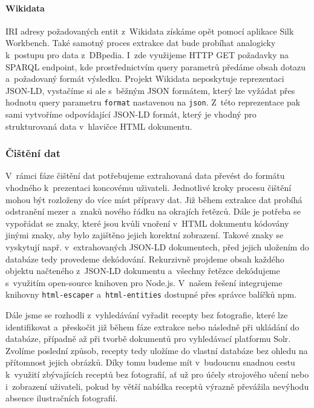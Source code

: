 \paragraph{Wikidata}

IRI adresy požadovaných entit z~Wikidata získáme opět pomocí aplikace Silk Workbench. Také samotný proces extrakce dat bude probíhat analogicky k~postupu pro data z~DBpedia. I~zde využijeme HTTP GET požadavky na SPARQL endpoint, kde prostřednictvím query parametrů předáme obsah dotazu a~požadovaný formát výsledku. Projekt Wikidata neposkytuje reprezentaci JSON-LD, vystačíme si ale s~běžným JSON formátem, který lze vyžádat přes hodnotu query parametru \texttt{format} nastavenou na \texttt{json}. Z~této reprezentace pak sami vytvoříme odpovídající JSON-LD formát, který je vhodný pro strukturovaná data v~hlavičce HTML dokumentu.

\subsubsection{Čištění dat}

V~rámci fáze čištění dat potřebujeme extrahovaná data převést do formátu vhodného k~prezentaci koncovému uživateli. Jednotlivé kroky procesu čištění mohou být rozloženy do více míst přípravy dat. Již během extrakce dat probíhá odstranění mezer a~znaků nového řádku na okrajích řetězců. Dále je potřeba se vypořádat se znaky, které jsou kvůli vnoření v~HTML dokumentu kódovány jinými znaky, aby bylo zajištěno jejich korektní zobrazení. Takové znaky se vyskytují např. v~extrahovaných JSON-LD dokumentech, před jejich uložením do databáze tedy provedeme dekódování. Rekurzivně projdeme obsah každého objektu načteného z~JSON-LD dokumentu a~všechny řetězce dekódujeme s~využitím open-source knihoven pro Node.js. V~našem řešení integrujeme knihovny \texttt{html-escaper} a~\texttt{html-entities} dostupné přes správce balíčků npm.

Dále jsme se rozhodli z~vyhledávání vyřadit recepty bez fotografie, které lze identifikovat a~přeskočit již během fáze extrakce nebo následně při ukládání do databáze, případně až při tvorbě dokumentů pro vyhledávací platformu Solr. Zvolíme poslední způsob, recepty tedy uložíme do vlastní databáze bez ohledu na přítomnost jejich obrázků. Díky tomu budeme mít v~budoucnu snadnou cestu k~využití zbývajících receptů bez fotografií, ať už pro účely strojového učení nebo i~zobrazení uživateli, pokud by větší nabídka receptů výrazně převážila nevýhodu absence ilustračních fotografií.

